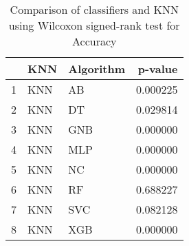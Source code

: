 \begin{table}
\footnotesize
\caption{Comparison of classifiers and KNN using Wilcoxon signed-rank test for Accuracy}
\label{tab:KNN wilcoxon Accuracy comparison}
\begin{tabular}{lllr}
\hline
 & KNN & Algorithm & p-value \\
\hline
1 & KNN & AB & 0.000225 \\
2 & KNN & DT & 0.029814 \\
3 & KNN & GNB & 0.000000 \\
4 & KNN & MLP & 0.000000 \\
5 & KNN & NC & 0.000000 \\
6 & KNN & RF & 0.688227 \\
7 & KNN & SVC & 0.082128 \\
8 & KNN & XGB & 0.000000 \\
\hline
\end{tabular}
\end{table}
